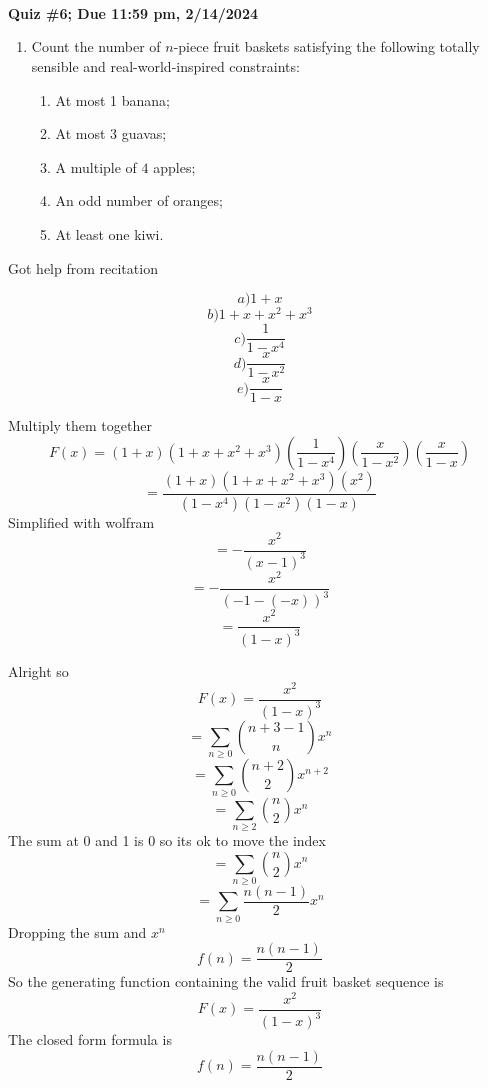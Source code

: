 \documentclass[10pt, AMS Euler]{article}
\begin{document}
	
	\\
        \\
	
	\noindent \underline{\hspace{2in}}\\
	
	{\bf Quiz \#6; Due 11:59 pm, 2/14/2024}\\

        \newpage
	\begin{enumerate}
		\item Count the number of $n$-piece fruit baskets satisfying the following totally sensible and real-world-inspired constraints: 
		\begin{enumerate}
			\item At most 1 banana; 
			\item At most $3$ guavas;
			\item A multiple of $4$ apples;
			\item An odd number of oranges;
			\item At least one kiwi.
		\end{enumerate} 
        \end{enumerate}

        Got help from recitation

        $$ a) 1 + x $$
        $$ b) 1 + x + x^2 + x^3 $$
        $$ c) \frac{1}{1-x^4} $$
        $$ d) \frac{x}{1-x^2} $$
        $$ e) \frac{x}{1-x} $$

        Multiply them together
        $$ F(x) = (1 + x)(1 + x + x^2 + x^3)(\frac{1}{1-x^4})(\frac{x}{1-x^2})(\frac{x}{1-x}) $$
        $$ = \frac{(1+x)(1+x+x^2+x^3)(x^2)}{(1-x^4)(1-x^2)(1-x)} $$
        Simplified with wolfram
        $$ = - \frac{x^2}{(x-1)^3} $$
        $$ = - \frac{x^2}{(-1-(-x))^3}$$
        $$ = \frac{x^2}{(1-x)^3} $$

        Alright so
        $$ F(x) = \frac{x^2}{(1-x)^3} $$
        $$ = \sum_{n\geq0} \binom{n+3-1}{n} x^n $$
        $$ = \sum_{n\geq0} \binom{n+2}{2} x^{n+2} $$
        $$ = \sum_{n\geq2} \binom{n}{2} x^n $$
        The sum at 0 and 1 is 0 so its ok to move the index
        $$ = \sum_{n\geq0} \binom{n}{2} x^n $$
        $$ = \sum_{n\geq0} \frac{n(n-1)}{2} x^n $$
        Dropping the sum and $x^n$
        $$ f(n) = \frac{n(n-1)}{2} $$
        So the generating function containing the valid fruit basket sequence is
        $$ F(x) = \frac{x^2}{(1-x)^3} $$
        The closed form formula is 
        $$ f(n) = \frac{n(n-1)}{2} $$
        
\end{document}
